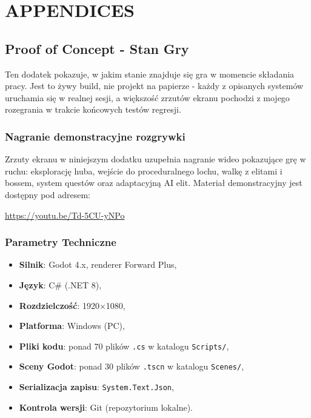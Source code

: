 
\part*{APPENDICES}

\chapter{Proof of Concept - Stan Gry}
\label{appA}

Ten dodatek pokazuje, w jakim stanie znajduje się gra w momencie składania pracy. Jest to żywy build, nie projekt na papierze - każdy z opisanych systemów uruchamia się w realnej sesji, a większość zrzutów ekranu pochodzi z mojego rozegrania w trakcie końcowych testów regresji.

\section{Nagranie demonstracyjne rozgrywki}

Zrzuty ekranu w niniejszym dodatku uzupełnia nagranie wideo pokazujące grę w ruchu: eksplorację huba, wejście do proceduralnego lochu, walkę z elitami i bossem, system questów oraz adaptacyjną AI elit. Materiał demonstracyjny jest dostępny pod adresem:

\url{https://youtu.be/Td-5CU-yNPo}

\section{Parametry Techniczne}

\begin{itemize}
    \item \textbf{Silnik}: Godot 4.x, renderer Forward Plus,
    \item \textbf{Język}: C\# (.NET 8),
    \item \textbf{Rozdzielczość}: 1920$\times$1080,
    \item \textbf{Platforma}: Windows (PC),
    \item \textbf{Pliki kodu}: ponad 70 plików \texttt{.cs} w katalogu \texttt{Scripts/},
    \item \textbf{Sceny Godot}: ponad 30 plików \texttt{.tscn} w katalogu \texttt{Scenes/},
    \item \textbf{Serializacja zapisu}: \texttt{System.Text.Json},
    \item \textbf{Kontrola wersji}: Git (repozytorium lokalne).
\end{itemize}

